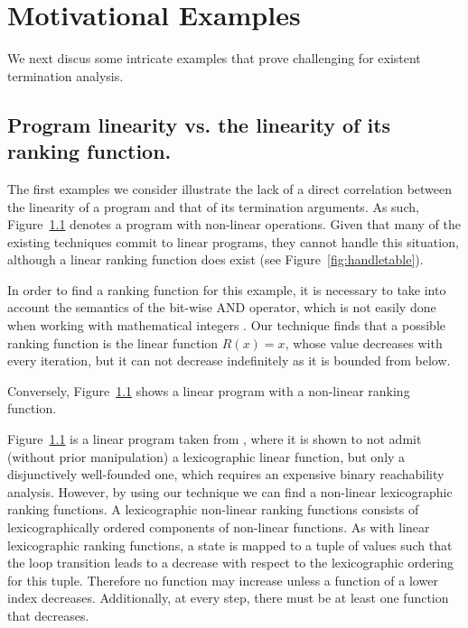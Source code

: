 \documentclass[preprint]{sigplanconf}
\theoremstyle{definition}
\begin{document}


\section{Motivational Examples} 
We next discus some intricate examples that prove challenging for existent termination analysis.


\subsection{Program linearity vs. the linearity of its ranking function.}
The first examples we consider illustrate the lack of a direct correlation between the linearity of a program and that of its termination arguments.
As such, Figure~\ref{} denotes a program with non-linear operations. Given that  many of the existing techniques commit to linear programs, they cannot handle this situation, 
although a linear ranking function does exist (see Figure~\ref{fig:handletable}). 

In order to find a ranking function for this example, it is necessary to take into account
the semantics of the bit-wise AND operator, which is not easily done when working with mathematical integers \cite{}.
Our technique finds that a possible ranking function is the linear function
$R(x) = x$, whose value decreases with
every iteration, but it can not decrease indefinitely as it is bounded from below.

Conversely, Figure~\ref{} shows a linear program with a non-linear ranking function.

Figure~\ref{} is a linear program taken from \cite{DBLP:conf/tacas/CookSZ13}, where it is shown to not admit (without prior manipulation) a lexicographic linear function, but only a disjunctively well-founded one, 
which requires an expensive binary reachability analysis.
However, by using our technique we can find a non-linear lexicographic ranking functions.
A lexicographic non-linear ranking functions consists of lexicographically ordered components
of non-linear functions. As with linear lexicographic ranking functions, a state is mapped to a tuple of values such that the
loop transition leads to a decrease with respect to the lexicographic
ordering for this tuple. Therefore no function may increase unless a function of
a lower index decreases. Additionally, at every step, there must be at least one
function that decreases.
\end{document}
